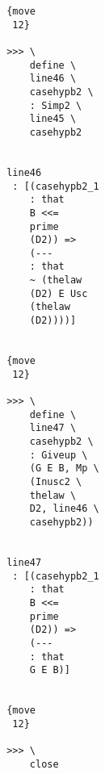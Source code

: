 \documentclass[12pt]{article}
\begin{document}
\begin{verbatim}
                                       {move 
                                        12}

                                       >>> \
                                           define \
                                           line46 \
                                           casehypb2 \
                                           : Simp2 \
                                           line45 \
                                           casehypb2


                                       line46 
                                        : [(casehypb2_1 
                                           : that 
                                           B <<= 
                                           prime 
                                           (D2)) => 
                                           (--- 
                                           : that 
                                           ~ (thelaw 
                                           (D2) E Usc 
                                           (thelaw 
                                           (D2))))]


                                       {move 
                                        12}

                                       >>> \
                                           define \
                                           line47 \
                                           casehypb2 \
                                           : Giveup \
                                           (G E B, Mp \
                                           (Inusc2 \
                                           thelaw \
                                           D2, line46 \
                                           casehypb2))


                                       line47 
                                        : [(casehypb2_1 
                                           : that 
                                           B <<= 
                                           prime 
                                           (D2)) => 
                                           (--- 
                                           : that 
                                           G E B)]


                                       {move 
                                        12}

                                       >>> \
                                           close



\end{verbatim}
\end{document}
